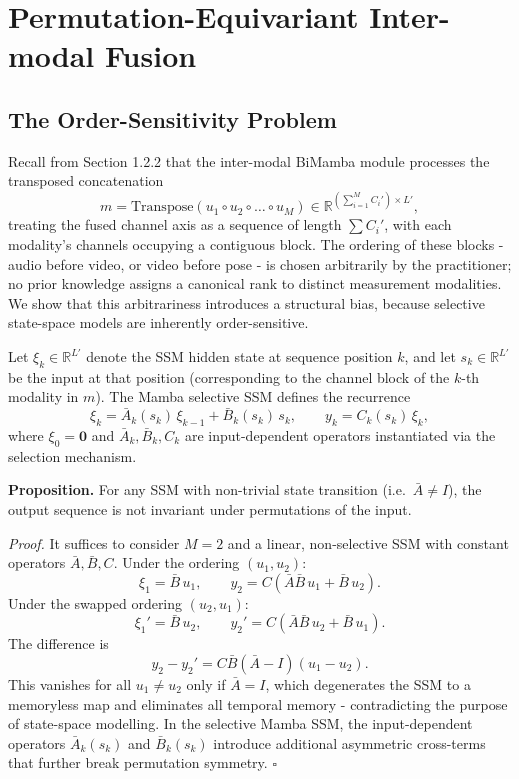 \documentclass[11pt,a4paper]{article}
\newcommand{\R}{\mathbb{R}}
\begin{document}
	\section{Permutation-Equivariant Inter-modal Fusion}
	
	\subsection{The Order-Sensitivity Problem}
	
	Recall from Section 1.2.2 that the inter-modal BiMamba module processes the transposed concatenation
	$$m = \text{Transpose}(u_1 \circ u_2 \circ \dots \circ u_M) \in \R^{(\sum_{i=1}^{M} C_i') \times L'},$$
	treating the fused channel axis as a sequence of length $\sum C_i'$, with each modality's channels occupying a contiguous block. The ordering of these blocks - audio before video, or video before pose - is chosen arbitrarily by the practitioner; no prior knowledge assigns a canonical rank to distinct measurement modalities. We show that this arbitrariness introduces a structural bias, because selective state-space models are inherently order-sensitive.
	
	Let $\xi_k \in \R^{L'}$ denote the SSM hidden state at sequence position $k$, and let $s_k \in \R^{L'}$ be the input at that position (corresponding to the channel block of the $k$-th modality in $m$). The Mamba selective SSM \cite{gu2023mamba} defines the recurrence
	$$\xi_k = \bar{A}_k(s_k)\,\xi_{k-1} + \bar{B}_k(s_k)\,s_k, \qquad y_k = C_k(s_k)\,\xi_k,$$
	where $\xi_0 = \mathbf{0}$ and $\bar{A}_k,\bar{B}_k,C_k$ are input-dependent operators instantiated via the selection mechanism.
	
	\textbf{Proposition.} For any SSM with non-trivial state transition (i.e.\ $\bar{A} \neq I$), the output sequence is not invariant under permutations of the input.
	
	\textit{Proof.} It suffices to consider $M = 2$ and a linear, non-selective SSM with constant operators $\bar{A}, \bar{B}, C$. Under the ordering $(u_1, u_2)$:
	$$\xi_1 = \bar{B}\,u_1, \qquad y_2 = C\!\left(\bar{A}\bar{B}\,u_1 + \bar{B}\,u_2\right).$$
	Under the swapped ordering $(u_2, u_1)$:
	$$\xi_1' = \bar{B}\,u_2, \qquad y_2' = C\!\left(\bar{A}\bar{B}\,u_2 + \bar{B}\,u_1\right).$$
	The difference is
	$$y_2 - y_2' = C\bar{B}(\bar{A} - I)(u_1 - u_2).$$
	This vanishes for all $u_1 \neq u_2$ only if $\bar{A} = I$, which degenerates the SSM to a memoryless map and eliminates all temporal memory - contradicting the purpose of state-space modelling. In the selective Mamba SSM, the input-dependent operators $\bar{A}_k(s_k)$ and $\bar{B}_k(s_k)$ introduce additional asymmetric cross-terms that further break permutation symmetry. $\square$
	
\end{document}
